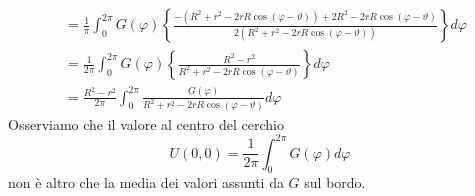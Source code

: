 \begin{dimostrazione}
\begin{align*}
                       & =\frac{1}{\pi }\int ^{2\pi }_{0} G(\varphi)\left\{\frac{-\left(R^{2} +r^{2} -2rR\cos(\varphi -\vartheta)\right) +2R^{2} -2rR\cos(\varphi -\vartheta)}{2\left(R^{2} +r^{2} -2rR\cos(\varphi -\vartheta)\right)}\right\} d\varphi \\
                       & =\frac{1}{2\pi }\int ^{2\pi }_{0} G(\varphi)\left\{\frac{R^{2} -r^{2}}{R^{2} +r^{2} -2rR\cos(\varphi -\vartheta)}\right\} d\varphi                                                                                              \\
                       & =\frac{R^{2} -r^{2}}{2\pi }\int ^{2\pi }_{0}\frac{G(\varphi)}{R^{2} +r^{2} -2rR\cos(\varphi -\vartheta)} d\varphi
    \end{align*}
    Osserviamo che il valore al centro del cerchio
    \begin{equation*}
        U(0,0) =\frac{1}{2\pi }\int ^{2\pi }_{0} G(\varphi) d\varphi
    \end{equation*}
    non è altro che la media dei valori assunti da $G$ sul bordo.


\end{dimostrazione}
